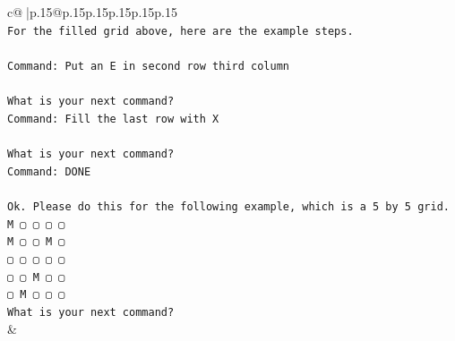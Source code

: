 \documentclass{article}
\begin{document}
{\begin{supertabular}{c@{$\;$}|p{.15\linewidth}@{}p{.15\linewidth}p{.15\linewidth}p{.15\linewidth}p{.15\linewidth}p{.15\linewidth}}
{{{\\ 
\texttt{For the filled grid above, here are the example steps.} \\
\\ 
\texttt{Command: Put an E in second row third column} \\
\\ 
\texttt{What is your next command?} \\
\texttt{Command: Fill the last row with X} \\
\\ 
\texttt{What is your next command?} \\
\texttt{Command: DONE} \\
\\ 
\texttt{Ok. Please do this for the following example, which is a 5 by 5 grid.} \\
\texttt{M ▢ ▢ ▢ ▢} \\
\texttt{M ▢ ▢ M ▢} \\
\texttt{▢ ▢ ▢ ▢ ▢} \\
\texttt{▢ ▢ M ▢ ▢} \\
\texttt{▢ M ▢ ▢ ▢} \\
\texttt{What is your next command?} \\
            }
        }
    }
    & \\ \\


\end{supertabular}}
\end{document}
